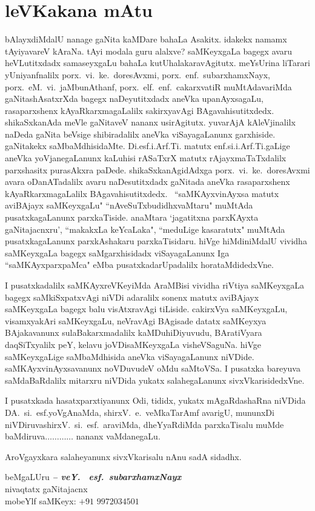 \chapter*{leVKakana mAtu}
\vskip -25pt

bAlayxdiMdalU nanage gaNita kaMDare bahaLa Asakitx. idakekx namamx tAyiyavareV kAraNa. tAyi modala 
guru alalxve? saMKeyxgaLa bagegx avaru heVLutitxdadx samaseyxgaLu bahaLa kutUhalakaravAgitutx. 
meYsUrina liTarari yUniyanfnalilx porx.\ vi.~ke.\ doresAvxmi, porx.\ enf.\ subarxhamxNayx, 
porx.\ eM.\ vi.\ jaMbunAthanf, porx.\ elf.~enf.~cakarxvatiR muMtAdavariMda gaNitashAsatxrXda bagegx    naDeyutitxdadx aneVka upanAyxsagaLu, rasaparxshenx kAyaR\-karxmagaLalilx sakirxyavAgi BAgavahisutitxdedx. shikaSxkanAda meVle gaNitaveV nananx usirAgitutx. yuvarAjA kAleVjinalilx naDeda gaNita beVsige shibiradalilx aneVka viSayagaLanunx garxhiside. gaNitakekx saMbaMdhisidaMte. Di.esf.i.Arf.Ti. matutx enf.si.i.Arf.Ti.gaLige aneVka yoVjanegaLanunx kaLuhisi rASaTxrX matutx rAjayx\-maTaTxdalilx parxshasitx purasAkxra paDede. shikaSxkanAgidAdxga porx.~vi.~ke.\ doresAvxmi avara oDanATadalilx avaru naDesutitxdadx gaNitada aneVka rasaparxshenx kAyaRkarxmagaLalilx BAgavahisutitxdedx. ~``saMKAyxvinAyxsa matutx aviBAjayx saMKeyxgaLu" ``nAveSuTx\-budidhxvaMtaru" muMtAda pusatxkagaLanunx parxkaTiside. anaMtara `jagatitxna parxKAyxta gaNitajacnxru', ``makakxLa keYcaLaka", ``meduLige kasaratutx" muMtAda pusatxkagaLanunx parxkAshakaru parxkaTisidaru. hiVge hiMdiniMdalU vividha saMKeyxgaLa bagegx saMgarxhisidadx viSayagaLanunx Iga ``saMKAyxparxpaMca" eMba pusatxkadarUpadalilx horataMdidedxVne. 

I pusatxkadalilx saMKAyxreVKeyiMda AraMBisi vividha riVtiya saMKeyxgaLa bagegx saMkiSxpatxvAgi niVDi adaralilx sonenx matutx aviBAjayx saMKeyxgaLa bagegx balu visAtxravAgi tiLiside. cakirxVya saMKeyxgaLu, visamxyakAri saMKeyxgaLu, neVravAgi BAgisade datatx saMKeyxya BAjakavanunx sulaBakarxmadalilx kaMDuhiDiyuvudu, BAratiVyara daqSiTxyalilx peY, kelavu joVDisaMKeyxgaLa visheVSaguNa. hiVge saMKeyxgaLige saMbaMdhisida aneVka viSayagaLanunx niVDide. saMKAyxvinAyxsavanunx noVDuvudeV oMdu saMtoVSa. I pusatxka bareyuva saMdaBaRdalilx mitarxru niVDida yukatx salahegaLanunx sivxVkarisidedxVne.

I pusatxkada hasatxparxtiyanunx Odi, tididx, yukatx mAgaRdashaRna niVDida DA.~si.~esf.\break yoVgAnaMda, shirxV.~e.~veMkaTarAmf avarigU, mununxDi niVDiruva\break shirxV.~si.~esf.~araviMda, dheYyaRdiMda parxkaTisalu muMde baMdiruva$\ldots\ldots\ldots\ldots$ nananx vaMdanegaLu.

AroVgayxkara salaheyanunx sivxVkarisalu nAnu sadA sidadhx.

\begin{flushright}
beMgaLUru \hfill {\sl\bfseries {\rm --} veY. ~esf.\ subarxhamxNayx}\hfill\\
nivaqtatx gaNitajacnx\\
mobeYlf saMKeyx: $+91$ $9972034501$
\end{flushright}


